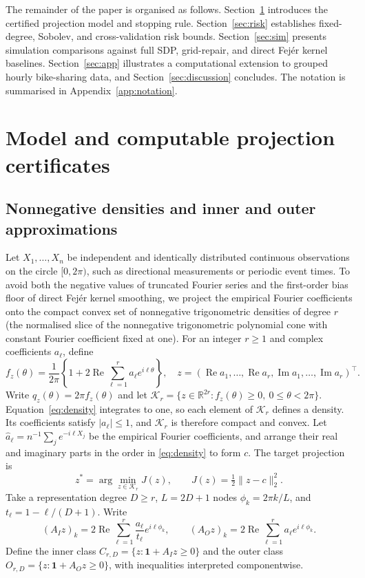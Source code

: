The remainder of the paper is organised as follows. Section~\ref{sec:model} introduces the certified projection model and stopping rule. Section~\ref{sec:risk} establishes fixed-degree, Sobolev, and cross-validation risk bounds. Section~\ref{sec:sim} presents simulation comparisons against full SDP, grid-repair, and direct Fejér kernel baselines. Section~\ref{sec:app} illustrates a computational extension to grouped hourly bike-sharing data, and Section~\ref{sec:discussion} concludes. The notation is summarised in Appendix~\ref{app:notation}.

\section{Model and computable projection certificates}\label{sec:model}
\subsection{Nonnegative densities and inner and outer approximations}
Let \(X_1,\dots,X_n\) be independent and identically distributed continuous observations on the circle \([0,2\pi)\), such as directional measurements or periodic event times. To avoid both the negative values of truncated Fourier series and the first-order bias floor of direct Fejér kernel smoothing, we project the empirical Fourier coefficients onto the compact convex set of nonnegative trigonometric densities of degree \(r\) (the normalised slice of the nonnegative trigonometric polynomial cone with constant Fourier coefficient fixed at one). For an integer \(r\ge1\) and complex coefficients \(a_\ell\), define
\begin{equation}
f_z(\theta)=\frac1{2\pi}\left\{1+2\operatorname{Re}\sum_{\ell=1}^r a_\ell e^{i\ell\theta}\right\},\quad
z=(\operatorname{Re}a_1,\ldots,\operatorname{Re}a_r,\operatorname{Im}a_1,\ldots,\operatorname{Im}a_r)^\top .
\label{eq:density}
\end{equation}
Write \(q_z(\theta)=2\pi f_z(\theta)\) and let \(\mathcal K_r=\{z\in\mathbb R^{2r}: f_z(\theta)\ge0,\ 0\le\theta<2\pi\}\). Equation~\eqref{eq:density} integrates to one, so each element of \(\mathcal K_r\) defines a density. Its coefficients satisfy \(|a_\ell|\le1\), and \(\mathcal K_r\) is therefore compact and convex. Let \(\hat a_\ell=n^{-1}\sum_j e^{-i\ell X_j}\) be the empirical Fourier coefficients, and arrange their real and imaginary parts in the order in \eqref{eq:density} to form \(c\). The target projection is
\begin{equation}
z^*=\arg\min_{z\in\mathcal K_r}J(z),\qquad J(z)=\tfrac12\|z-c\|_2^2.
\label{eq:projection}
\end{equation}
Take a representation degree \(D\ge r\), \(L=2D+1\) nodes \(\phi_k=2\pi k/L\), and \(t_\ell=1-\ell/(D+1)\). Write
\begin{equation}
(A_Iz)_k=2\operatorname{Re}\sum_{\ell=1}^r\frac{a_\ell}{t_\ell}e^{i\ell\phi_k},\qquad
(A_Oz)_k=2\operatorname{Re}\sum_{\ell=1}^ra_\ell e^{i\ell\phi_k}.
\label{eq:matrices}
\end{equation}
Define the inner class \(C_{r,D}=\{z:\mathbf1+A_Iz\ge0\}\) and the outer class \(O_{r,D}=\{z:\mathbf1+A_Oz\ge0\}\), with inequalities interpreted componentwise.

